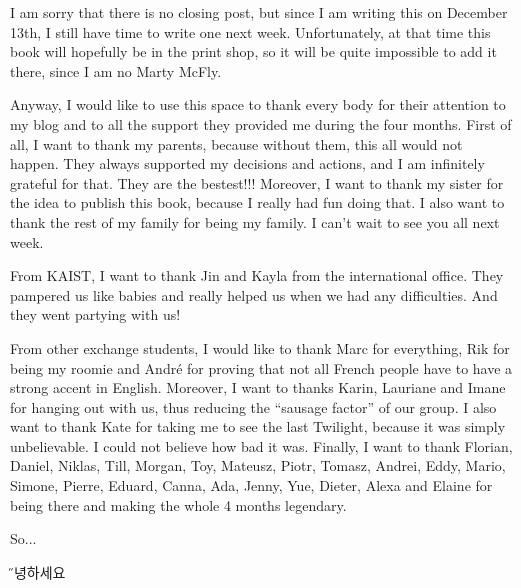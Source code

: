 \clearpage

I am sorry that there is no closing post, but since I am writing this on December 13th, I still have time to write one next week. Unfortunately, at that time this book will hopefully be in the print shop, so it will be quite impossible to add it there, since I am no Marty McFly.

Anyway, I would like to use this space to thank every body for their attention to my blog and to all the support they provided me during the four months. First of all, I want to thank my parents, because without them, this all would not happen. They always supported my decisions and actions, and I am infinitely grateful for that. They are the bestest!!! Moreover, I want to thank my sister for the idea to publish this book, because I really had fun doing that. I also want to thank the rest of my family for being my family. I can't wait to see you all next week.

From KAIST, I want to thank Jin and Kayla from the international office. They pampered us like babies and really helped us when we had any difficulties. And they went partying with us!

From other exchange students, I would like to thank Marc for everything, Rik for being my roomie and André for proving that not all French people have to have a strong accent in English. Moreover, I want to thanks Karin, Lauriane and Imane for hanging out with us, thus reducing the ``sausage factor'' of our group. I also want to thank Kate for taking me to see the last Twilight, because it was simply unbelievable. I could not believe how bad it was. Finally, I want to thank Florian, Daniel, Niklas, Till, Morgan, Toy, Mateusz, Piotr, Tomasz, Andrei, Eddy, Mario, Simone, Pierre, Eduard, Canna, Ada, Jenny, Yue, Dieter, Alexa and Elaine for being there and making the whole 4 months legendary.

So...

{\hfill\H 안녕하세요}